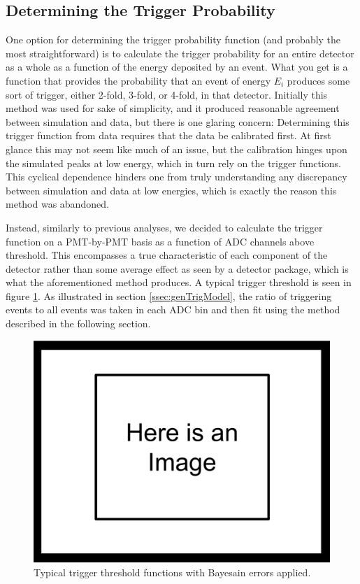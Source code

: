 \subsection{Determining the Trigger Probability}
One option for determining the trigger probability function (and probably the 
most straightforward) is to calculate the trigger probability for an entire detector as 
a whole as a function of the energy deposited by an event. What you get is a 
function that provides the probability that an event of energy $ E_i $ 
produces some sort of trigger, either 2-fold, 3-fold, or 4-fold, in that 
detector. Initially this method was used for sake of simplicity, and it produced 
reasonable agreement between simulation and data, but there is one 
glaring concern: Determining this trigger function from data requires that the data be 
calibrated first. At first glance this may not seem like much of an issue, but the 
calibration hinges upon the 
simulated peaks at low energy, which in turn rely on the trigger functions. This 
cyclical dependence hinders one from truly understanding any discrepancy between 
simulation and data at low energies, which is exactly the reason this method was 
abandoned.  

Instead, similarly to previous analyses, we decided to calculate the trigger
function on a PMT-by-PMT basis as a function of ADC channels above threshold. This
encompasses a true characteristic of each component of the detector rather than some
average effect as seen by a detector package, which is what the aforementioned 
method produces. A typical trigger threshold is seen in figure \ref{fig:trigger_thresh}.
As illustrated in section \ref{ssec:genTrigModel}, the ratio of triggering events
to all events was taken in each ADC bin and then fit using the method described
in the following section.
  

\begin{figure}[h] \label{fig:trigger_thresh}
\centering
\includegraphics[scale=.25]{3-UCNAAnalysis/ImageHolder.pdf}
\caption{Typical trigger threshold functions with Bayesain errors 
applied. }
\end{figure}

